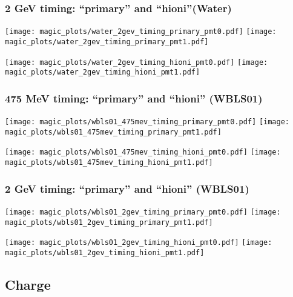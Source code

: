 \documentclass[xcolor=dvipsnames]{beamer}
\begin{document}
\begin{frame}[fragile]
  \frametitle{2 GeV timing:  ``primary'' and ``hioni''(Water)}

\texttt{[image: magic\_plots/water\_2gev\_timing\_primary\_pmt0.pdf]}%
\texttt{[image: magic\_plots/water\_2gev\_timing\_primary\_pmt1.pdf]}%

\texttt{[image: magic\_plots/water\_2gev\_timing\_hioni\_pmt0.pdf]}%
\texttt{[image: magic\_plots/water\_2gev\_timing\_hioni\_pmt1.pdf]}%
\end{frame}


\begin{frame}[fragile]
  \frametitle{475 MeV timing: ``primary'' and ``hioni'' (WBLS01)}

\texttt{[image: magic\_plots/wbls01\_475mev\_timing\_primary\_pmt0.pdf]}%
\texttt{[image: magic\_plots/wbls01\_475mev\_timing\_primary\_pmt1.pdf]}%

\texttt{[image: magic\_plots/wbls01\_475mev\_timing\_hioni\_pmt0.pdf]}%
\texttt{[image: magic\_plots/wbls01\_475mev\_timing\_hioni\_pmt1.pdf]}%
\end{frame}

\begin{frame}[fragile]
  \frametitle{2 GeV timing: ``primary'' and ``hioni'' (WBLS01)}

\texttt{[image: magic\_plots/wbls01\_2gev\_timing\_primary\_pmt0.pdf]}%
\texttt{[image: magic\_plots/wbls01\_2gev\_timing\_primary\_pmt1.pdf]}%

\texttt{[image: magic\_plots/wbls01\_2gev\_timing\_hioni\_pmt0.pdf]}%
\texttt{[image: magic\_plots/wbls01\_2gev\_timing\_hioni\_pmt1.pdf]}%
\end{frame}


\subsection{Charge}
\end{document}
